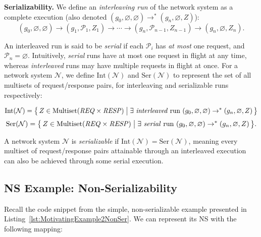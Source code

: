 \smallskip
\noindent
\textbf{Serializability.}
We define an \textit{interleaving run} of the network system as a complete execution (also denoted \((g_0,\varnothing,\varnothing)\rightarrow^{*}(g_n,\varnothing,Z)\)):
\[
(g_0,\varnothing,\varnothing) \rightarrow (g_1,\mathcal{P}_1,Z_1)
\rightarrow \cdots \rightarrow (g_n,\mathcal{P}_{n-1},Z_{n-1}) \rightarrow (g_n,\varnothing,Z_n).
\]

\noindent
%
An interleaved run is said to be \textit{serial} if each $\mathcal{P}_i$ has \textit{at most} one request, and $\mathcal{P}_n=\varnothing$.
%
Intuitively, \textit{serial} runs have at most one request in flight at any time,
whereas \emph{interleaved} runs may have multiple requests in flight at once.
%
For a network system \(\mathcal{N}\), we define \(\mathrm{Int}(\mathcal{N})\) and \(\mathrm{Ser}(\mathcal{N})\) to  represent the set of all multisets of request/response pairs, for interleaving and serializable runs respectively:

\[
\mathrm{Int}(\mathcal{N})
= \bigl\{\, Z \in \mathrm{Multiset}(\mathit{REQ}\times \mathit{RESP})
\;\big|\; \exists\ \text{\textit{interleaved} run } (g_0,\varnothing,\varnothing)\rightarrow^{*}(g_n,\varnothing,Z) \,\bigr\}
\]
\[
\mathrm{Ser}(\mathcal{N})
= \bigl\{\, Z \in \mathrm{Multiset}(\mathit{REQ}\times \mathit{RESP})
\;\big|\; \exists\ \text{\textit{serial} run } (g_0,\varnothing,\varnothing)\rightarrow^{*}(g_n,\varnothing,Z) \,\bigr\}.
\]



A network system $\mathcal{N}$ is \emph{serializable} if $\text{Int}(\mathcal{N}) = \text{Ser}(\mathcal{N})$, meaning every multiset of request/response pairs attainable through an interleaved execution can also be achieved through some serial execution.





\subsection{NS Example: Non-Serializability }
\label{sec:ns-non-serializable}

Recall the code snippet from the simple, non-serializable example presented in Listing~\ref{lst:MotivatingExample2NonSer}. We can represent its NS with the following mapping:

